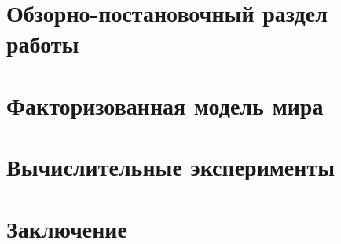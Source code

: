 \documentclass[12pt]{article} %
\begin{document}
\section{Обзорно-постановочный раздел работы}



\clearpage
\section{Факторизованная модель мира}



\clearpage
\section{Вычислительные эксперименты}



\clearpage
\section{Заключение}



\clearpage



\end{document}
